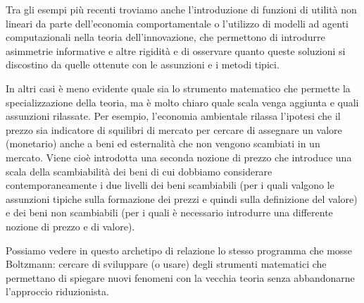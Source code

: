 \documentclass[a4paper, headings=standardclasses]{scrartcl}
\begin{document}
Tra gli esempi più recenti troviamo anche l'introduzione di funzioni di utilità non lineari
da parte dell'economia comportamentale o l'utilizzo di modelli ad agenti computazionali nella teoria dell'innovazione, che permettono di introdurre asimmetrie informative e altre rigidità e di osservare quanto queste soluzioni si discostino da quelle ottenute con le assunzioni e i metodi tipici.

In altri casi è meno evidente quale sia lo strumento matematico che permette la specializzazione della teoria, ma è molto chiaro quale scala venga aggiunta e quali assunzioni rilassate. Per esempio, l'economia ambientale rilassa l'ipotesi che il prezzo sia indicatore di squilibri di mercato per cercare di assegnare un valore (monetario) anche a beni ed esternalità che non vengono scambiati in un mercato.
Viene cioè introdotta una seconda nozione di prezzo che introduce una scala della scambiabilità dei beni di cui dobbiamo considerare contemporaneamente i due livelli dei beni scambiabili (per i quali valgono le assunzioni tipiche sulla formazione dei prezzi e quindi sulla definizione del valore) e dei beni non scambiabili (per i quali è necessario introdurre una differente nozione di prezzo e di valore).

Possiamo vedere in questo archetipo di relazione lo stesso programma che mosse Boltzmann: cercare di sviluppare (o usare) degli strumenti matematici che permettano di spiegare nuovi fenomeni con la vecchia teoria senza abbandonarne l'approccio riduzionista.
\end{document}
